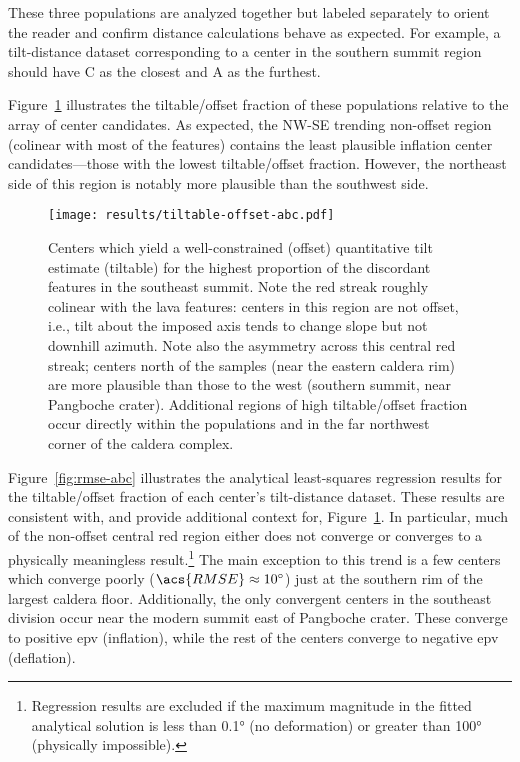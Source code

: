 These three populations are analyzed together but labeled separately to orient the reader and confirm distance calculations behave as expected. For example, a tilt-distance dataset corresponding to a center in the southern summit region should have C as the closest and A as the furthest.

Figure~\ref{fig:tiltable-offset-abc} illustrates the tiltable/offset fraction of these populations relative to the array of center candidates. As expected, the NW-SE trending non-offset region (colinear with most of the features) contains the least plausible inflation center candidates---those with the lowest tiltable/offset fraction. However, the northeast side of this region is notably more plausible than the southwest side.

\begin{figure}
    \texttt{[image: results/tiltable-offset-abc.pdf]}%
    \caption[Centers by tiltable/offset fraction]{Centers which yield a well-constrained (offset) quantitative tilt estimate (tiltable) for the highest proportion of the discordant features in the southeast summit. Note the red streak roughly colinear with the lava features: centers in this region are not offset, i.e., tilt about the imposed axis tends to change slope but not downhill azimuth. Note also the asymmetry across this central red streak; centers north of the samples (near the eastern caldera rim) are more plausible than those to the west (southern summit, near Pangboche crater). Additional regions of high tiltable/offset fraction occur directly within the populations and in the far northwest corner of the caldera complex.}%
    \label{fig:tiltable-offset-abc}
\end{figure}

Figure~\ref{fig:rmse-abc} illustrates the analytical least-squares regression results for the tiltable/offset fraction of each center's tilt-distance dataset. These results are consistent with, and provide additional context for, Figure~\ref{fig:tiltable-offset-abc}. In particular, much of the non-offset central red region either does not converge or converges to a physically meaningless result.\footnote{Regression results are excluded if the maximum magnitude in the fitted analytical solution is less than \ang{0.1} (no deformation) or greater than \ang{100} (physically impossible).} The main exception to this trend is a few centers which converge poorly ($\acs{RMSE}\approx\ang{10}$) just at the southern rim of the largest caldera floor. Additionally, the only convergent centers in the southeast division occur near the modern summit east of Pangboche crater. These converge to positive \acs{epv} (inflation), while the rest of the centers converge to negative \acs{epv} (deflation).

